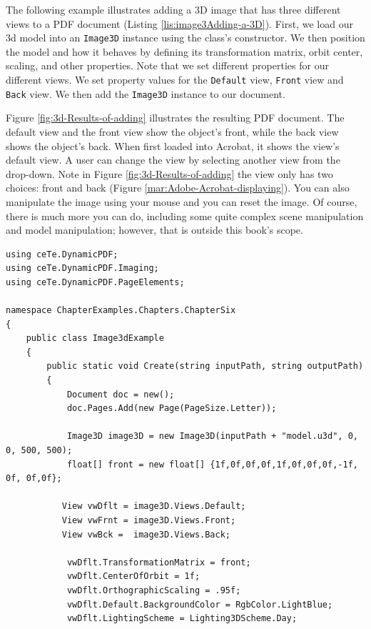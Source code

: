 \documentclass[american]{tufte-book}
\numberwithin{equation}{section}
\numberwithin{figure}{section}
\begin{document}
{The following example illustrates adding a 3D image that has three
different views to a PDF document (Listing \ref{lis:image3Adding-a-3D}).
First, we load our 3d model into an \texttt{Image3D} instance using the class's
constructor. We then position the model and how it behaves by defining
its transformation matrix, orbit center, scaling, and other properties. Note that we set different properties for our different views. We
set property values for the \texttt{Default} view, \texttt{Front}
view and \texttt{Back} view. We then add the \texttt{Image3D} instance
to our document.

Figure \ref{fig:3d-Results-of-adding} illustrates the resulting PDF
document. The default view and the front view show the object's front,
while the back view shows the object's back. When first loaded into
Acrobat, it shows the view's default view. A user can change the view
by selecting another view from the drop-down. Note in Figure
\ref{fig:3d-Results-of-adding} the view only has two choices: front
and back (Figure \ref{mar:Adobe-Acrobat-displaying}). You can also
manipulate the image using your mouse and you can reset the image.
Of course, there is much more you can do, including some quite complex
scene manipulation and model manipulation; however, that is outside
this book's scope.

\bgroup{}
\begin{lstlisting}[caption={Adding a 3D image.},label={lis:image3Adding-a-3D},basicstyle={\footnotesize\ttfamily},breaklines=true]
using ceTe.DynamicPDF;
using ceTe.DynamicPDF.Imaging;
using ceTe.DynamicPDF.PageElements;

namespace ChapterExamples.Chapters.ChapterSix
{
    public class Image3dExample
    {
        public static void Create(string inputPath, string outputPath)
        {
            Document doc = new();
            doc.Pages.Add(new Page(PageSize.Letter));
            
            Image3D image3D = new Image3D(inputPath + "model.u3d", 0, 0, 500, 500);
            float[] front = new float[] {1f,0f,0f,0f,1f,0f,0f,0f,-1f, 0f, 0f,0f};

           View vwDflt = image3D.Views.Default;
           View vwFrnt = image3D.Views.Front;
           View vwBck =  image3D.Views.Back;

            vwDflt.TransformationMatrix = front;
            vwDflt.CenterOfOrbit = 1f;
            vwDflt.OrthographicScaling = .95f;
            vwDflt.Default.BackgroundColor = RgbColor.LightBlue;
            vwDflt.LightingScheme = Lighting3DScheme.Day;


\end{lstlisting}}
\end{document}
